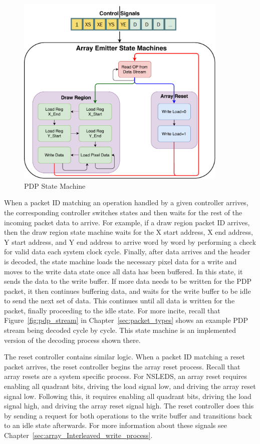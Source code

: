    \begin{figure}[t]
        \centering
        \includegraphics[width=0.90\textwidth]{fig/pdp_state_machine.pdf}
        \caption{PDP State Machine}
        \label{fig:state_machine}
    \end{figure}


    When a packet ID matching an operation handled by a given controller arrives, the corresponding controller switches states and then waits for the rest of the incoming packet data to arrive. For example, if a draw region packet ID arrives, then the draw region state machine waits for the X start address, X end address, Y start address, and Y end address to arrive word by word by performing a check for valid data each system clock cycle. Finally, after data arrives and the header is decoded, the state machine loads the necessary pixel data for a write and moves to the write data state once all data has been buffered. In this state, it sends the data to the write buffer. If more data needs to be written for the PDP packet, it then continues buffering data, and waits for the write buffer to be idle to send the next set of data. This continues until all data is written for the packet, finally proceeding to the idle state. For more incite, recall that Figure~\ref{fig:pdp_stream} in Chapter~\ref{sec:packet_types} shows an example PDP stream being decoded cycle by cycle. This state machine is an implemented version of the decoding process shown there.

    The reset controller contains similar logic. When a packet ID matching a reset packet arrives, the reset controller begins the array reset process. Recall that array resets are a system specific process. For NSLEDS, an array reset requires enabling all quadrant bits, driving the load signal low, and driving the array reset signal low. Following this, it requires enabling all quadrant bits, driving the load signal high, and driving the array reset signal high. The reset controller does this by sending a request for both operations to the write buffer and transitions back to an idle state afterwards. For more information about these signals see Chapter~\ref{sec:array_Interleaved_write_process}.

